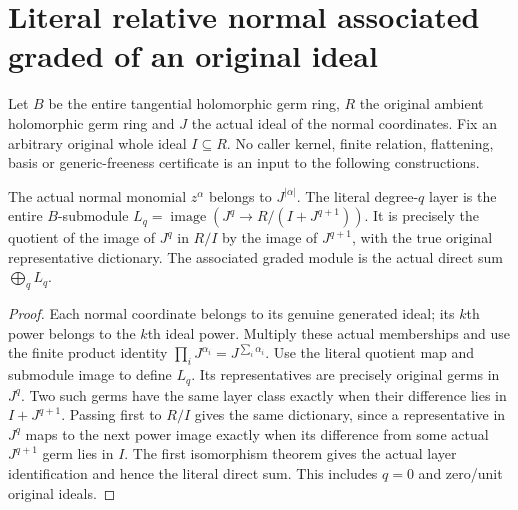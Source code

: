 \section{Literal relative normal associated graded of an original ideal}
Let $B$ be the entire tangential holomorphic germ ring, $R$ the original
ambient holomorphic germ ring and $J$ the actual ideal of the normal
coordinates. Fix an arbitrary original whole ideal $I\subseteq R$.
No caller kernel, finite relation, flattening, basis or generic-freeness
certificate is an input to the following constructions.

\begin{theorem}
\label{hir:relative-normal-graded-literal-layers}
\leanok
{}
The actual normal monomial $z^\alpha$ belongs to $J^{|\alpha|}$.
The literal degree-$q$ layer is the entire $B$-submodule
$L_q=\operatorname{image}(J^q\longrightarrow R/(I+J^{q+1}))$.
It is precisely the quotient of the image of $J^q$ in $R/I$ by the image
of $J^{q+1}$, with the true original representative dictionary. The
associated graded module is the actual direct sum $\bigoplus_q L_q$.
\end{theorem}
\begin{proof}
Each normal coordinate belongs to its genuine generated ideal; its $k$th
power belongs to the $k$th ideal power. Multiply these actual memberships
and use the finite product identity $\prod_iJ^{\alpha_i}=J^{\sum_i\alpha_i}$.
Use the literal quotient map and submodule image to define $L_q$. Its
representatives are precisely original germs in $J^q$. Two such germs
have the same layer class exactly when their difference lies in
$I+J^{q+1}$. Passing first to $R/I$ gives the same dictionary, since a
representative in $J^q$ maps to the next power image exactly when its
difference from some actual $J^{q+1}$ germ lies in $I$. The first
isomorphism theorem gives the actual layer identification and hence the
literal direct sum. This includes $q=0$ and zero/unit original ideals.
\end{proof}

